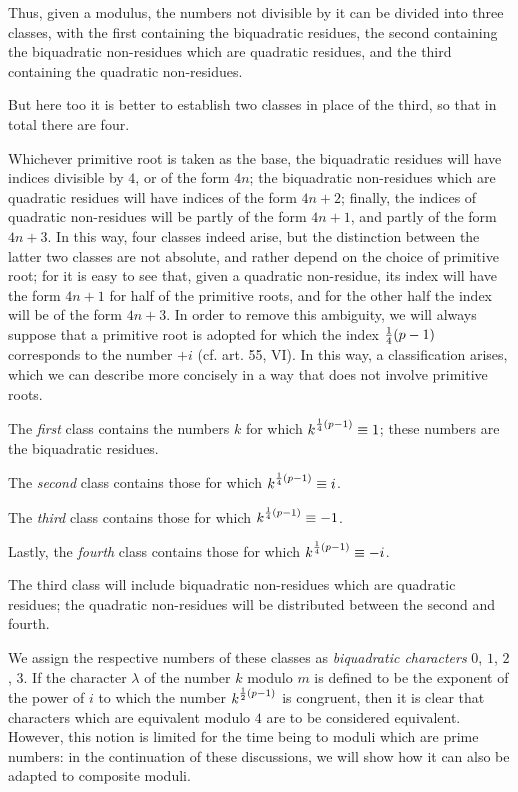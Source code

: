 \documentclass[twoside,12pt]{memoir}
\let\oldfrac\frac
\def\frac#1#2{\mathchoice{\tfrac{#1}{#2}}{\oldfrac{#1}{#2}}{\genfrac{}{}{}{2}{#1}{#2\mathstrut}}{\genfrac{}{}{}{3}{#1}{#2\mathstrut}}}
\begin{document}
Thus, given a modulus, the numbers not divisible by it can be divided into three classes, with the first containing the biquadratic residues, the second containing the biquadratic non-residues which are quadratic residues, and the third containing the quadratic non-residues.
%

But here too it is better to establish two classes in place of the third, so that in total there are four.

Whichever primitive root is taken as the base, the biquadratic residues will have indices divisible by \(4\), or of the form \(4n\); the biquadratic non-residues which are quadratic residues will have indices of the form \(4n+2\); finally, the indices of quadratic non-residues will be partly of the form \(4n+1\), and partly of the form \(4n+3\). In this way, four classes indeed arise, but the distinction between the latter two classes are not absolute, and rather depend on the choice of primitive root; for it is easy to see that, given a quadratic non-residue, its index will have the form \(4n+1\) for half of the primitive roots, and for the other half the index will be of the form \(4n+3\). In order to remove this ambiguity, we will always suppose that a primitive root is adopted for which the index \(\frac{1}{4}(p-1)\) corresponds to the number \(+i\) (cf. art. 55, VI). In this way, a classification arises, which we can describe more concisely in a way that does not involve primitive roots.

The \textit{first} class contains the numbers \(k\) for which \(k^{\frac{1}{4}(p-1)} \equiv 1\); these numbers are the biquadratic residues.

The \textit{second} class contains those for which \(k^{\frac{1}{4}(p-1)} \equiv i\).

The \textit{third} class contains those for which \(k^{\frac{1}{4}(p-1)} \equiv-1\).

Lastly, the \textit{fourth} class contains those for which \(k^{\frac{1}{4}(p-1)} \equiv-i\).

The third class will include biquadratic non-residues which are quadratic residues; the quadratic non-residues will be distributed between the second and fourth.

We assign the respective numbers of these classes as \textit{biquadratic characters} \(0\), \(1\), \(2\), \(3\). If the character \(\lambda\) of the number \(k\) modulo \(m\) is defined to be the exponent of the power of \(i\) to which the number \(k^{\frac{1}{2}(p-1)}\) is congruent, then it is clear that characters which are equivalent modulo \(4\) are to be considered equivalent. However, this notion is limited for the time being to moduli which are prime numbers: in the continuation of these discussions, we will show how it can also be adapted to composite moduli.
%
\end{document}
